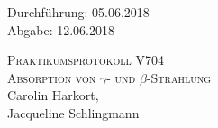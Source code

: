 

\begin{titlepage}
  \begin{flushleft}
 Durchführung: 05.06.2018\\
 Abgabe: 12.06.2018
  \end{flushleft}



 \begin{center}


\textsc{\LARGE Praktikumsprotokoll V704}\\[1.5cm]
\textsc{\huge Absorption von $\gamma$- und $\beta$-Strahlung } \\[5,5cm]

Carolin Harkort\footnotemark[1], \\
Jacqueline Schlingmann\footnotemark[2] \\[1,0cm]



 \end{center}

 \vfill

\end{titlepage}


  
  

\nocite{*}
\printbibliography

